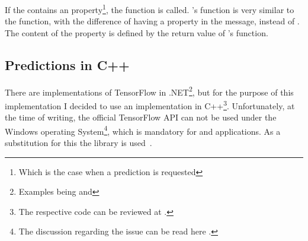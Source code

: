 If the  contains an  property\footnote{Which is the case when a prediction is requested}, the  function is called.
's  function is very similar to the  function, with the difference of having a  property in the message, instead of .
The content of the  property is defined by the return value of 's  function.

\subsection{Predictions in C++}

There are implementations of TensorFlow in .NET\footnote{Examples being  and }, but for the purpose of this implementation I decided to use an implementation in C++\footnote{The respective code can be reviewed at .}.
Unfortunately, at the time of writing, the official TensorFlow API can not be used under the Windows operating System\footnote{The discussion regarding the issue can be read here .}, which is mandatory for  and  applications.
As a substitution for this the  library is used~\cite{Hermann2021}.

